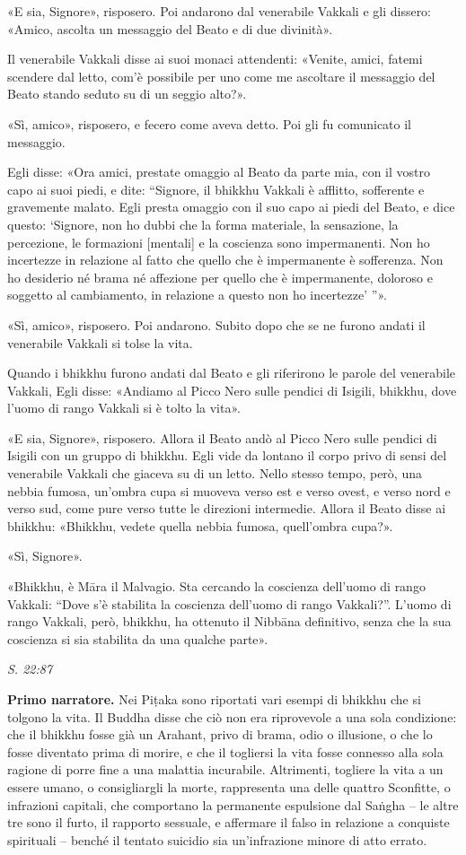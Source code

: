 «E sia, Signore», risposero. Poi andarono dal venerabile Vakkali e gli
dissero: «Amico, ascolta un messaggio del Beato e di due divinità».


Il venerabile Vakkali disse ai suoi monaci attendenti: «Venite, amici,
fatemi scendere dal letto, com’è possibile per uno come me ascoltare il
messaggio del Beato stando seduto su di un seggio alto?».


«Sì, amico», risposero, e fecero come aveva detto. Poi gli fu comunicato
il messaggio.


Egli disse: «Ora amici, prestate omaggio al Beato da parte mia, con il
vostro capo ai suoi piedi, e dite: “Signore, il bhikkhu Vakkali è
afflitto, sofferente e gravemente malato. Egli presta omaggio con il suo
capo ai piedi del Beato, e dice questo: ‘Signore, non ho dubbi che la
forma materiale, la sensazione, la percezione, le formazioni [mentali] e
la coscienza sono impermanenti. Non ho incertezze in relazione al fatto
che quello che è impermanente è sofferenza. Non ho desiderio né brama né
affezione per quello che è impermanente, doloroso e soggetto al
cambiamento, in relazione a questo non ho incertezze’ ”».


«Sì, amico», risposero. Poi andarono. Subito dopo che se ne furono
andati il venerabile Vakkali si tolse la vita.


Quando i bhikkhu furono andati dal Beato e gli riferirono le parole del
venerabile Vakkali, Egli disse: «Andiamo al Picco Nero sulle pendici di
Isigili, bhikkhu, dove l’uomo di rango Vakkali si è tolto la vita».


«E sia, Signore», risposero. Allora il Beato andò al Picco Nero sulle
pendici di Isigili con un gruppo di bhikkhu. Egli vide da lontano il
corpo privo di sensi del venerabile Vakkali che giaceva su di un letto.
Nello stesso tempo, però, una nebbia fumosa, un’ombra cupa si muoveva
verso est e verso ovest, e verso nord e verso sud, come pure verso tutte
le direzioni intermedie. Allora il Beato disse ai bhikkhu: «Bhikkhu,
vedete quella nebbia fumosa, quell’ombra cupa?».


«Sì, Signore».


«Bhikkhu, è Māra il Malvagio. Sta cercando la coscienza dell’uomo di
rango Vakkali: “Dove s’è stabilita la coscienza dell’uomo di rango
Vakkali?”. L’uomo di rango Vakkali, però, bhikkhu, ha ottenuto il
Nibbāna definitivo, senza che la sua coscienza si sia stabilita da una
qualche parte».


\emph{S. 22:87}


\textbf{Primo narratore.} Nei Piṭaka sono riportati vari esempi di bhikkhu che si
tolgono la vita. Il Buddha disse che ciò non era riprovevole a una sola
condizione: che il bhikkhu fosse già un Arahant, privo di brama, odio o
illusione, o che lo fosse diventato prima di morire, e che il togliersi
la vita fosse connesso alla sola ragione di porre fine a una malattia
incurabile. Altrimenti, togliere la vita a un essere umano, o
consigliargli la morte, rappresenta una delle quattro Sconfitte, o
infrazioni capitali, che comportano la permanente espulsione dal Saṅgha
– le altre tre sono il furto, il rapporto sessuale, e affermare il falso
in relazione a conquiste spirituali – benché il tentato suicidio sia
un’infrazione minore di atto errato.


